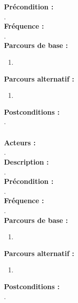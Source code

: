 \documentclass[../rapport.tex]{subfiles}
\begin{document}
\textbf{Précondition :} \\
. \\

\textbf{Fréquence :} \\
. \\

\textbf{Parcours de base :} \\
\begin{enumerate}
    \item 
\end{enumerate}
\bigskip

\textbf{Parcours alternatif :}
\begin{enumerate}
    \item 
\end{enumerate}

\textbf{Postconditions :} \\
. \\



\subsubsection{}

\textbf{Acteurs :} \\
. \\

\textbf{Description :} \\
. \\

\textbf{Précondition :} \\
. \\

\textbf{Fréquence :} \\
. \\

\textbf{Parcours de base :} \\
\begin{enumerate}
    \item 
\end{enumerate}
\bigskip

\textbf{Parcours alternatif :}
\begin{enumerate}
    \item 
\end{enumerate}

\textbf{Postconditions :} \\
. \\



\subsubsection{}
\end{document}

